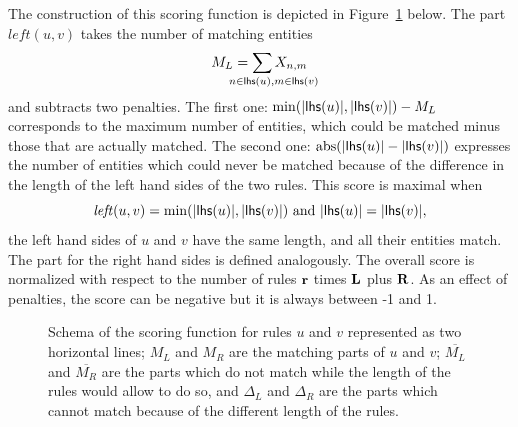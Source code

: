 \documentclass[a4paper,twoside]{article}
\begin{document}
The construction of this scoring function is depicted in Figure~\ref{fig:scoring} below.
The part $\mathit{left}(u,v)$ takes the number of matching entities $$M_L=\sum_{\mathrlap{n \in \lhs{u}, m \in \lhs{v}}} X_{n,m}$$ and subtracts two penalties. The first one: $\min(|\mathsf{lhs}(u)|, |\mathsf{lhs}(v)|) - M_L$ corresponds to the maximum number of entities, which could be matched minus those that are actually matched. The second one: 
$\mathop{\mathrm{abs}}(|\mathsf{lhs}(u)| - |\mathsf{lhs}(v)|)$ expresses the number of entities which could never be matched because of the difference in the length of the left hand sides of  the two rules.
This score is maximal when $$\mathit{left}(u,v) = \min(|\mathsf{lhs}(u)|, |\mathsf{lhs}(v)|) \text{ and } |\mathsf{lhs}(u)| = |\mathsf{lhs}(v)|,$$ \ie the left hand sides of $u$ and $v$ have the same length, and all their entities match. 
The part for the right hand sides is defined analogously.
The overall score is normalized with respect to the number of rules $\mathbf{r}$ times $\mathbf{L}$ plus $\mathbf{R}$. As an effect of penalties, the score can be negative but it is always between -1 and 1.


\begin{figure}[b]
  \begin{center}
\end{center}
  \caption{\label{fig:scoring}
Schema of the scoring function for rules $u$ and $v$ represented as two horizontal lines; $M_L$ and $M_R$ are the matching parts of  $u$ and $v$;   
$\overline{M_L}$ and $\overline{M_R}$ are the parts which do not match while the length of the rules would allow to do so, and $\Delta_L$ and $\Delta_R$ are the parts which cannot match because of the different length of the rules.}
\end{figure}
\end{document}
